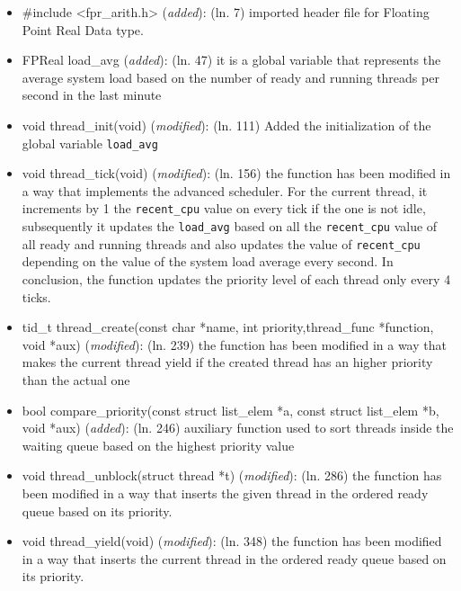\documentclass[11pt]{scrartcl}
\begin{document}
\begin{itemize}
    \item #include <fpr\_arith.h>  (\textit{added}): \newline
    (ln. 7) imported header file for Floating Point Real Data type.
    \item FPReal load\_avg  (\textit{added}): \newline
    (ln. 47) it is a global variable that represents the average system load based on the number of ready and running threads per second in the last minute
	\item void thread\_init(void) (\textit{modified}): \newline
	(ln. 111) Added the initialization of the global variable \texttt{load\_avg} 
	\item void thread\_tick(void) (\textit{modified}): \newline
	(ln. 156) the function has been modified in a way that implements the advanced scheduler. For the current thread, 
	it increments by 1 the \texttt{recent\_cpu} value on every tick if the one is not idle, subsequently it updates the \texttt{load\_avg} based on all the \texttt{recent\_cpu} value of all ready and running threads and also updates the value of \texttt{recent\_cpu} 
	depending on the value of the system load average every second. In conclusion, the function updates the priority level of each thread only every 4 ticks.   

	\item tid\_t thread\_create(const char *name, int priority,thread\_func *function, void *aux) (\textit{modified}): \newline %
	(ln. 239) the function has been modified in a way that makes the current thread yield if the created thread has an higher priority than the actual one 
	\item bool compare\_priority(const struct list\_elem *a, const struct list\_elem *b, void *aux) (\textit{added}): \newline 
	(ln. 246) auxiliary function used to sort threads inside the waiting queue based on the highest priority value
	
	\item void thread\_unblock(struct thread *t) (\textit{modified}): \newline 
	(ln. 286) the function has been modified in a way that inserts the given thread in the ordered ready queue based on its priority. 
	\item void thread\_yield(void) (\textit{modified}): \newline 
	(ln. 348) the function has been modified in a way that inserts the current thread in the ordered ready queue based on its priority. 
	

\end{itemize}
\end{document}
